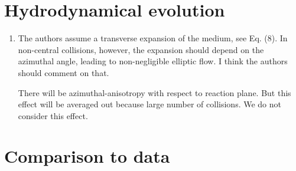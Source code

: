 \documentclass[aps,prc,preprint,superscriptaddress,showpacs,showkeys]{revtex4-1}
\begin{document}
\section{Hydrodynamical evolution}

\begin{enumerate}
\item { \color{red} The authors assume a transverse expansion of the medium, see Eq.
(8). In non-central collisions, however, the expansion should depend
on the azimuthal angle, leading to non-negligible elliptic flow. I
think the authors should comment on that.}

{ \color{blue} There will be azimuthal-anisotropy with respect to reaction plane. But this
effect will be averaged out because large number of collisions. We do not consider this effect. }

\end{enumerate}

\section{Comparison to data}
\end{document}
